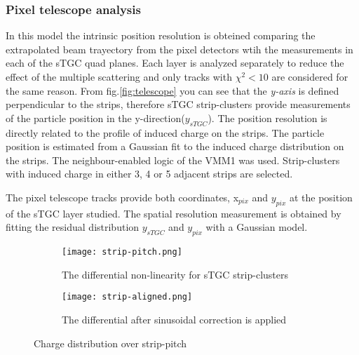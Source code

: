 \subsubsection{Pixel telescope analysis}
In this model the intrinsic position resolution is obteined comparing the extrapolated beam trayectory from the pixel detectors
wtih the measurements in each of the sTGC quad planes. Each layer is analyzed separately to reduce the effect of the
multiple scattering and only tracks with $\chi^2<10$ are considered for the same reason. From fig.\ref{fig:telescope}
you can see that the {\it y-axis} is defined perpendicular to the strips, therefore sTGC strip-clusters provide
measurements of the particle position in the y-direction($y_{sTGC}$).
The position resolution is directly related to the profile of induced charge on the strips. The particle position is
estimated from a Gaussian fit to the induced charge distribution on the strips. The neighbour-enabled logic of the VMM1
was used. Strip-clusters with induced charge in either 3, 4 or 5 adjacent strips are selected.\par
The pixel telescope tracks provide both coordinates, x$_{pix}$ and $y_{pix}$ at the position of the sTGC layer studied. The
spatial resolution measurement is obtained by fitting the residual distribution $y_{sTGC}$  and $y_{pix}$ with a Gaussian model.\par


\begin{figure}[ht]
	\centering
	\hfill
	\begin{subfigure}[b]{0.45\textwidth}
		\centering
		\texttt{[image: strip-pitch.png]}
		\caption{The differential non-linearity for sTGC strip-clusters}\label{fig:pitchfit}
	\end{subfigure}
	\hfill
	\begin{subfigure}[b]{0.45\textwidth}
		\centering
		\texttt{[image: strip-aligned.png]}
		\caption{The differential after sinusoidal correction is applied}\label{fig:pitchaligned}
	\end{subfigure}
	\hfill
	\caption{Charge distribution over strip-pitch}\label{fig:strip-pitch}
\end{figure}



